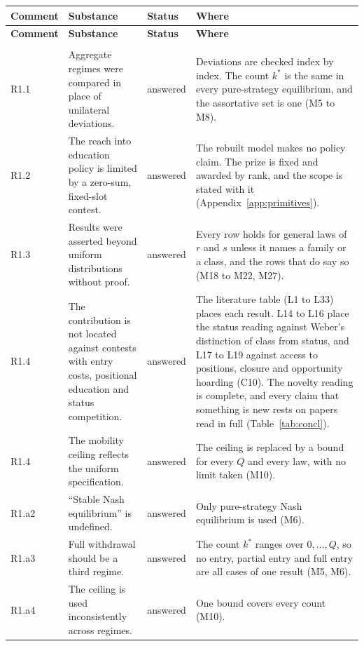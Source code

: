 \footnotesize
\begin{longtable}{@{}P{1.3cm}P{5.7cm}P{1.9cm}P{7.0cm}@{}}
\toprule
\textbf{Comment} & \textbf{Substance} & \textbf{Status} & \textbf{Where} \\
\midrule
\endfirsthead
\toprule
\textbf{Comment} & \textbf{Substance} & \textbf{Status} & \textbf{Where} \\
\midrule
\endhead
\bottomrule
\endfoot
{}\\[2pt]
R1.1 & Aggregate regimes were compared in place of unilateral deviations. &
  answered & Deviations are checked index by index. The count $k^*$ is the
  same in every pure-strategy equilibrium, and the assortative set is one
  (M5 to M8). \\
R1.2 & The reach into education policy is limited by a zero-sum, fixed-slot
  contest. & answered & The rebuilt model makes no policy claim. The prize is
  fixed and awarded by rank, and the scope is stated with it
  (Appendix~\ref{app:primitives}). \\
R1.3 & Results were asserted beyond uniform distributions without proof. &
  answered & Every row holds for general laws of $r$ and $s$ unless it names a
  family or a class, and the rows that do say so (M18 to M22, M27). \\
R1.4 & The contribution is not located against contests with entry costs,
  positional education and status competition. & answered & The
  literature table (L1 to L33) places each result. L14 to L16 place the
  status reading against Weber's distinction of class from status, and L17 to
  L19 against access to positions, closure and opportunity hoarding (C10).
  The novelty reading is complete, and every claim that something is new
  rests on papers read in full (Table~\ref{tab:concl}). \\
R1.4 & The mobility ceiling reflects the uniform specification. & answered &
  The ceiling is replaced by a bound for every $Q$ and every law, with no
  limit taken (M10). \\
R1.a2 & ``Stable Nash equilibrium'' is undefined. & answered & Only
  pure-strategy Nash equilibrium is used (M6). \\
R1.a3 & Full withdrawal should be a third regime. & answered & The count
  $k^*$ ranges over $0,\dots,Q$, so no entry, partial entry and full entry are
  all cases of one result (M5, M6). \\
R1.a4 & The ceiling is used inconsistently across regimes. & answered & One
  bound covers every count (M10). \\

\end{longtable}
